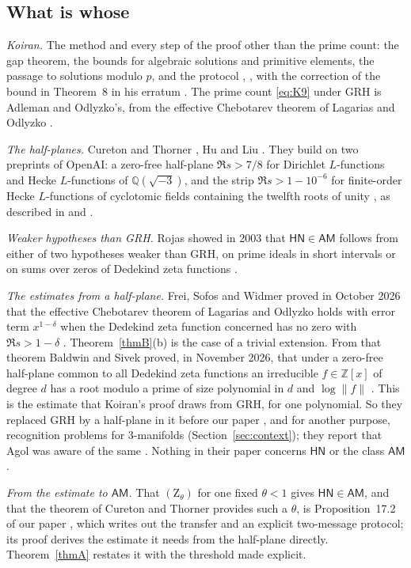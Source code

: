 \documentclass[11pt]{amsart}
\theoremstyle{definition}
\theoremstyle{remark}
\newcommand{\Z}{\mathbb Z}
\newcommand{\Q}{\mathbb Q}
\newcommand{\cl}[1]{\mathsf{#1}}
\newcommand{\HN}{\cl{HN}}
\newcommand{\AM}{\cl{AM}}
\newcommand{\Zh}[1]{(\mathrm Z_{#1})}
\begin{document}
\subsection{What is whose}
\emph{Koiran.} The method and every step of the proof other than the prime count: the gap theorem, the bounds for algebraic solutions and primitive elements, the passage to solutions modulo $p$, and the protocol \cite[Theorems~1, 2, 4, 5, 7, 8, Lemma~3, Corollary~1]{K96}, \cite[Theorem~2]{K96b}, with the correction of the bound in Theorem~8 in his erratum \cite{K97e}. The prime count \eqref{eq:K9} under GRH is Adleman and Odlyzko's, from the effective Chebotarev theorem of Lagarias and Odlyzko \cite{LO}.

\emph{The half-planes.} Cureton and Thorner \cite{CT}, Hu \cite{Hu} and Liu \cite{Liu}. They build on two preprints of OpenAI: a zero-free half-plane $\Re s>7/8$ for Dirichlet $L$-functions and Hecke $L$-functions of $\Q(\sqrt{-3})$, and the strip $\Re s>1-10^{-6}$ for finite-order Hecke $L$-functions of cyclotomic fields containing the twelfth roots of unity \cite[Theorem~1.2]{OAI}, as described in \cite[pp.~2--3]{CT} and \cite[p.~2]{Hu}.

\emph{Weaker hypotheses than GRH.} Rojas showed in 2003 that $\HN\in\AM$ follows from either of two hypotheses weaker than GRH, on prime ideals in short intervals or on sums over zeros of Dedekind zeta functions \cite[Theorem~1]{Roj}.

\emph{The estimates from a half-plane.} Frei, Sofos and Widmer proved in October 2026 that the effective Chebotarev theorem of Lagarias and Odlyzko holds with error term $x^{1-\delta}$ when the Dedekind zeta function concerned has no zero with $\Re s>1-\delta$ \cite[Theorem~1.1, p.~2]{FSW}. Theorem~\ref{thmB}(b) is the case of a trivial extension. From that theorem Baldwin and Sivek proved, in November 2026, that under a zero-free half-plane common to all Dedekind zeta functions an irreducible $f\in\Z[x]$ of degree $d$ has a root modulo a prime of size polynomial in $d$ and $\log\|f\|$ \cite[Theorem~2.1, p.~4]{BS}. This is the estimate that Koiran's proof draws from GRH, for one polynomial. So they replaced GRH by a half-plane in it before our paper \cite{N}, and for another purpose, recognition problems for $3$-manifolds (Section~\ref{sec:context}); they report that Agol was aware of the same \cite[p.~3]{BS}. Nothing in their paper concerns $\HN$ or the class $\AM$.

\emph{From the estimate to $\AM$.} That $\Zh\theta$ for one fixed $\theta<1$ gives $\HN\in\AM$, and that the theorem of Cureton and Thorner provides such a $\theta$, is Proposition~17.2 of our paper \cite[p.~59 and Table~1]{N}, which writes out the transfer and an explicit two-message protocol; its proof derives the estimate it needs from the half-plane directly. Theorem~\ref{thmA} restates it with the threshold made explicit.
\end{document}
